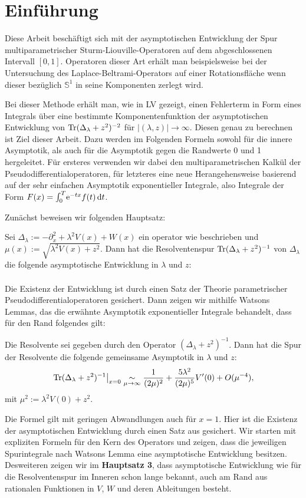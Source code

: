 \section{Einführung}
Diese Arbeit beschäftigt sich mit der asymptotischen Entwicklung der Spur
multiparametrischer Sturm-Liouville-Operatoren auf dem abgeschlossenen Intervall
$[0,1]$. Operatoren dieser Art erhält man beispielsweise bei der Untersuchung
des Laplace-Beltrami-Operators auf einer Rotationsfläche wenn dieser bezüglich
$\mathbb{S}^1$ in seine Komponenten zerlegt wird.

Bei dieser Methode erhält man, wie in LV gezeigt, einen Fehlerterm in Form eines
Integrals über eine bestimmte Komponentenfunktion der asymptotischen Entwicklung
von $\Tr(\Delta_\lambda + z^2)^{-2}$ für $\left|(\lambda, z)\right|\to\infty$.
Diesen genau zu berechnen ist Ziel dieser Arbeit. Dazu werden im Folgenden
Formeln sowohl für die innere Asymptotik, als auch für die Asymptotik gegen die
Randwerte 0 und 1 hergeleitet. Für ersteres verwenden wir dabei den
multiparametrischen Kalkül der Pseudodifferentialoperatoren, für letzteres eine
neue Herangehensweise basierend auf der sehr einfachen Asymptotik exponentieller
Integrale, also Integrale der Form $F(x) = \Integ[T]{0}{t}{\Eto{-tx}f(t)}$.

Zunächst beweisen wir folgenden Hauptsatz:
\begin{Hauptsatz}
  Sei $\Delta_\lambda := -\partial_x^2 + \lambda^2 V(x) + W(x)$ ein operator wie
  beschrieben und $\mu(x) := \sqrt{\lambda^2V(x)+z^2}$. Dann hat die
  Resolventenspur $\Tr(\Delta_\lambda + z^2)^{-1}$ von $\Delta_\lambda$ die
  folgende asymptotische Entwicklung in $\lambda$ und $z$:
  \begin{align*}
    
  \end{align*}  
\end{Hauptsatz}
Die Existenz der Entwicklung ist durch einen Satz der Theorie parametrischer
Pseudodifferentialoperatoren gesichert. Dann zeigen wir mithilfe Watsons
Lemmas, das die erwähnte Asymptotik exponentieller Integrale behandelt, dass für
den Rand folgendes gilt:
\begin{Hauptsatz}
  Die Resolvente sei gegeben durch den Operator $(\Delta_\lambda + z^2)^{-1}$.
  Dann hat die Spur der Resolvente die folgende gemeinsame Asymptotik in
  $\lambda$ und $z$:
  \begin{align*}
    \left.\Tr(\Delta_\lambda + z^2)^{-1}\right|_{x=0} \SimMu
    \frac{1}{(2\mu)^2} + \frac{5\lambda^2}{(2\mu)^5} V'(0) + O(\mu^{-4}),
  \end{align*}
  mit $\mu^2 := \lambda^2 V(0) + z^2$.
\end{Hauptsatz}
Die Formel gilt mit geringen Abwandlungen auch für $x=1$. Hier ist die Existenz
der asymptotischen Entwicklung durch einen Satz aus \cite{LV13} gesichert.  Wir
starten mit expliziten Formeln für den Kern des Operators und zeigen, dass die
jeweiligen Spurintegrale nach Watsons Lemma eine asymptotische Entwicklung
besitzen. Desweiteren zeigen wir im \textbf{Hauptsatz 3}, dass asymptotische
Entwicklung wie für die Resolventenspur im Inneren schon lange bekannt, auch am
Rand aus rationalen Funktionen in $V$, $W$ und deren Ableitungen besteht.

